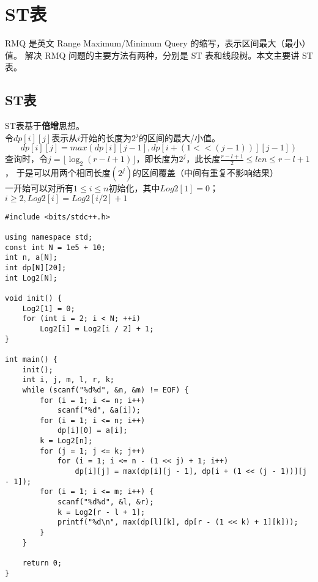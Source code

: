 \section{ST表}
RMQ 是英文 Range Maximum/Minimum Query 的缩写，表示区间最大（最小）值。
解决 RMQ 问题的主要方法有两种，分别是 ST 表和线段树。本文主要讲 ST 表。
\subsection{ST表}
    ST表基于\textbf{倍增}思想。\\
    令$dp[i][j]$表示从$i$开始的长度为$2^j$的区间的最大/小值。
    $$dp[i][j] = max(dp[i][j-1], dp[i+(1<<(j-1))][j-1])$$
    查询时，令$j=\lfloor \log_{2}{(r-l+1)} \rfloor$，即长度为$2^j$，此长度$\frac{r-l+1}{2} \le len \le r-l+1$，
    于是可以用两个相同长度$(2^j)$的区间覆盖（中间有重复不影响结果）\\
    一开始可以对所有$1\le i\le n$初始化，其中$Log2[1]=0$；$i\ge 2,Log2[i]=Log2[i/2]+1$
\begin{lstlisting}
#include <bits/stdc++.h>

using namespace std;
const int N = 1e5 + 10;
int n, a[N];
int dp[N][20];
int Log2[N];

void init() {
    Log2[1] = 0;
    for (int i = 2; i < N; ++i)
        Log2[i] = Log2[i / 2] + 1;
}

int main() {
    init();
    int i, j, m, l, r, k;
    while (scanf("%d%d", &n, &m) != EOF) {
        for (i = 1; i <= n; i++)
            scanf("%d", &a[i]);
        for (i = 1; i <= n; i++)
            dp[i][0] = a[i];
        k = Log2[n];
        for (j = 1; j <= k; j++)
            for (i = 1; i <= n - (1 << j) + 1; i++)
                dp[i][j] = max(dp[i][j - 1], dp[i + (1 << (j - 1))][j - 1]);
        for (i = 1; i <= m; i++) {
            scanf("%d%d", &l, &r);
            k = Log2[r - l + 1];
            printf("%d\n", max(dp[l][k], dp[r - (1 << k) + 1][k]));
        }
    }

    return 0;
}
\end{lstlisting}
